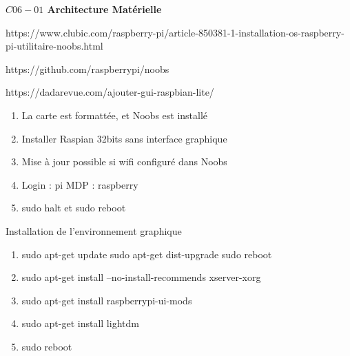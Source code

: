 \documentclass[a4paper,12pt]{article}
\begin{document}
\sffamily %
\begin{center}
 \large{\textbf{$C06-01$ Architecture Matérielle}}
\end{center}


https://www.clubic.com/raspberry-pi/article-850381-1-installation-os-raspberry-pi-utilitaire-noobs.html

https://github.com/raspberrypi/noobs

https://dadarevue.com/ajouter-gui-raspbian-lite/

\begin{enumerate}
\item La carte est formattée, et Noobs est installé
\item Installer Raspian 32bits sans interface graphique
\item Mise à jour possible si wifi configuré dans Noobs
\item Login : pi MDP : raspberry
\item sudo halt et sudo reboot


\end{enumerate}
Installation de l'environnement graphique

\begin{enumerate}
\item sudo apt-get update
sudo apt-get dist-upgrade
sudo reboot
\item sudo apt-get install --no-install-recommends xserver-xorg
\item sudo apt-get install raspberrypi-ui-mods
\item sudo apt-get install lightdm
\item sudo reboot
\end{enumerate}
\end{document}
